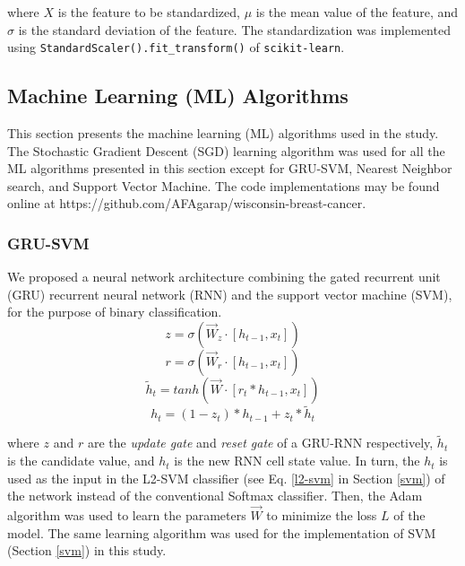 where $X$ is the feature to be standardized, $\mu$ is the mean value of the feature, and $\sigma$ is the standard deviation of the feature. The standardization was implemented using \texttt{StandardScaler().fit\_transform()} of \texttt{scikit-learn}\cite{scikit-learn}.

\subsection{Machine Learning (ML) Algorithms}\label{ml-algorithms}

This section presents the machine learning (ML) algorithms used in the study. The Stochastic Gradient Descent (SGD) learning algorithm was used for all the ML algorithms presented in this section except for GRU-SVM, Nearest Neighbor search, and Support Vector Machine. The code implementations may be found online at https://github.com/AFAgarap/wisconsin-breast-cancer.

\subsubsection{GRU-SVM}
We proposed a neural network architecture\cite{agarap2017neural} combining the gated recurrent unit (GRU) recurrent neural network (RNN) and the support vector machine (SVM), for the purpose of binary classification.
\begin{equation}\label{z-gate}
z	=	\sigma(\vec{W}_{z} \cdot [h_{t - 1}, x_{t}])
\end{equation}
\begin{equation}\label{r-gate}
r	=	\sigma(\vec{W}_{r} \cdot [h_{t - 1}, x_{t}])
\end{equation}
\begin{equation}\label{candidate-value}
\tilde{h}_{t}	=	tanh(\vec{W} \cdot [r_{t} * h_{t - 1}, x_{t}])
\end{equation}
\begin{equation}\label{new-value}
h_{t}	=	(1 - z_{t}) * h_{t - 1} + z_{t} * \tilde{h}_{t}
\end{equation}

where $z$ and $r$ are the \textit{update gate} and \textit{reset gate} of a GRU-RNN respectively, $\tilde{h}_{t}$ is the candidate value, and $h_{t}$ is the new RNN cell state value\cite{Cho}. In turn, the $h_{t}$ is used as the input in the L2-SVM classifier (see Eq. \ref{l2-svm} in Section \ref{svm}) of the network instead of the conventional Softmax classifier. Then, the Adam\cite{Kingma} algorithm was used to learn the parameters $\vec{W}$ to minimize the loss $L$ of the model. The same learning algorithm was used for the implementation of SVM (Section \ref{svm}) in this study.

